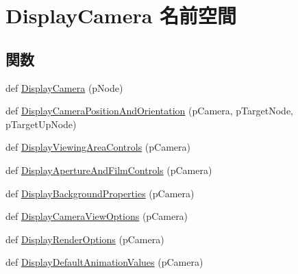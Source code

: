 \hypertarget{namespace_display_camera}{}\section{Display\+Camera 名前空間}
\label{namespace_display_camera}
\subsection*{関数}
\begin{DoxyCompactItemize}
\item 
def \hyperlink{namespace_display_camera_a8bcf7a6408b4fc2b2da40aac12f48ac3}{Display\+Camera} (p\+Node)
\item 
def \hyperlink{namespace_display_camera_a383f3ba6e5e74dab14b9fcb1b143376e}{Display\+Camera\+Position\+And\+Orientation} (p\+Camera, p\+Target\+Node, p\+Target\+Up\+Node)
\item 
def \hyperlink{namespace_display_camera_ad03e7cbcdea564576d8a0372d2d20099}{Display\+Viewing\+Area\+Controls} (p\+Camera)
\item 
def \hyperlink{namespace_display_camera_a96c32aeaf47f0a1715e8f21b7177afab}{Display\+Aperture\+And\+Film\+Controls} (p\+Camera)
\item 
def \hyperlink{namespace_display_camera_a714932b9564ba7802dd1e92c3908da3d}{Display\+Background\+Properties} (p\+Camera)
\item 
def \hyperlink{namespace_display_camera_aba2e1c221dcfce0d6e68860ee2b8716c}{Display\+Camera\+View\+Options} (p\+Camera)
\item 
def \hyperlink{namespace_display_camera_a0f97116ac35b4dcb17c6ddd917eebcd8}{Display\+Render\+Options} (p\+Camera)
\item 
def \hyperlink{namespace_display_camera_a9d3a19241d1c8bbb762ae5cfd6ec29d8}{Display\+Default\+Animation\+Values} (p\+Camera)
\end{DoxyCompactItemize}



